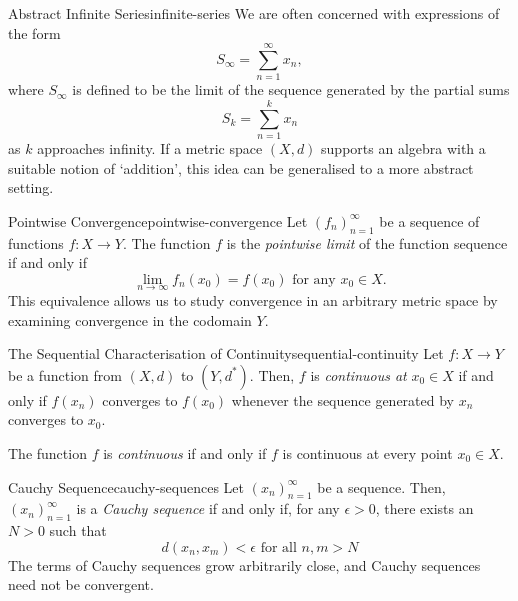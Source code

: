 \documentclass{article}
\numberwithin{equation}{section}
\numberwithin{figure}{section}
\begin{document}
\begin{example}{Abstract Infinite Series}{infinite-series}
    We are often concerned with expressions of the form
    \begin{equation}
        S_\infty = \sum_{n=1}^\infty x_n,
    \end{equation}
    where $ S_\infty $ is defined to be the limit of the sequence generated by
    the partial sums
    \begin{equation}
        S_k = \sum_{n=1}^k x_n
    \end{equation}
    as $ k $ approaches infinity. If a metric space $ (X, d) $ supports an
    algebra with a suitable notion of `addition', this idea can be generalised
    to a more abstract setting.
\end{example}
\begin{definition}{Pointwise Convergence}{pointwise-convergence}
    Let $ \left( f_n \right)_{n=1}^\infty $ be a sequence of functions $ f : X
    \to Y $. The function $ f $ is the \emph{pointwise limit} of the function
    sequence if and only if
    \begin{equation}
        \lim_{n \to \infty} f_n{\left( x_0 \right)} = f{\left( x_0 \right)}
        \text{ for any } x_0 \in X.
    \end{equation}
    This equivalence allows us to study convergence in an arbitrary metric space
    by examining convergence in the codomain $ Y $.
\end{definition}
\begin{definition}{The Sequential Characterisation of
        Continuity}{sequential-continuity}
    Let $ f : X \to Y $ be a function from $ (X, d) $ to $ (Y, d^*) $. Then, $ f
    $ is \emph{continuous at} $ x_0 \in X $ if and only if $ f{\left(x_n\right)}
    $ converges to $ f{\left(x_0\right)} $ whenever the sequence generated by $
    x_n $ converges to $ x_0 $.

    The function $ f $ is \emph{continuous} if and only if $ f $ is continuous
    at every point $ x_0 \in X $.
\end{definition}
\begin{definition}{Cauchy Sequence}{cauchy-sequences}
    Let $ \left( x_n \right)_{n=1}^\infty $ be a sequence. Then, $ \left( x_n
    \right)_{n=1}^\infty $ is a \emph{Cauchy sequence} if and only if, for any
    $ \epsilon > 0 $, there exists an $ N > 0 $ such that
    \begin{equation}
        d(x_n, x_m) < \epsilon \text{ for all } n, m > N
    \end{equation}
    The terms of Cauchy sequences grow arbitrarily close, and Cauchy sequences
    need not be convergent.
\end{definition}
\end{document}
